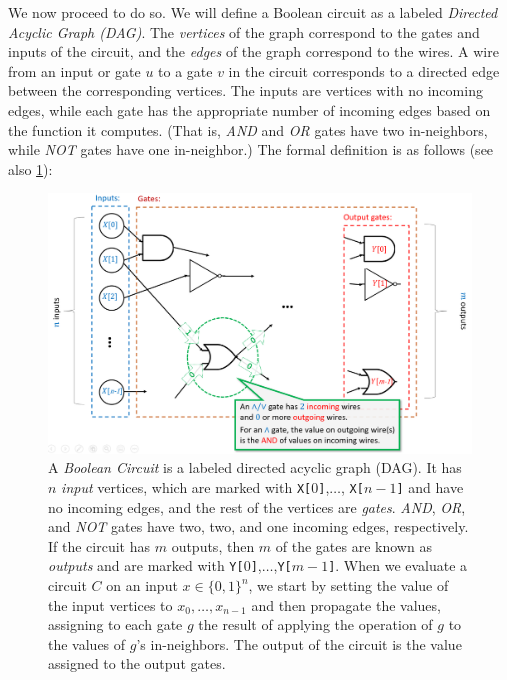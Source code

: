 We now proceed to do so. We will define a Boolean circuit as a labeled
\emph{Directed Acyclic Graph (DAG)}. The \emph{vertices} of the graph
correspond to the gates and inputs of the circuit, and the \emph{edges}
of the graph correspond to the wires. A wire from an input or gate \(u\)
to a gate \(v\) in the circuit corresponds to a directed edge between
the corresponding vertices. The inputs are vertices with no incoming
edges, while each gate has the appropriate number of incoming edges
based on the function it computes. (That is, \emph{AND} and \emph{OR}
gates have two in-neighbors, while \emph{NOT} gates have one
in-neighbor.) The formal definition is as follows (see also
\cref{generalcircuitfig}):


\begin{figure}
\centering
\includegraphics[width=\textwidth, height=0.25\paperheight, keepaspectratio]{../figure/generalcircuit.png}
\caption{A \emph{Boolean Circuit} is a labeled directed acyclic graph
(DAG). It has \(n\) \emph{input} vertices, which are marked with
\texttt{X[}\(0\)\texttt{]},\(\ldots\), \texttt{X[}\(n-1\)\texttt{]} and
have no incoming edges, and the rest of the vertices are \emph{gates}.
\emph{AND}, \emph{OR}, and \emph{NOT} gates have two, two, and one
incoming edges, respectively. If the circuit has \(m\) outputs, then
\(m\) of the gates are known as \emph{outputs} and are marked with
\texttt{Y[}\(0\)\texttt{]},\(\ldots\),\texttt{Y[}\(m-1\)\texttt{]}. When
we evaluate a circuit \(C\) on an input \(x\in \{0,1\}^n\), we start by
setting the value of the input vertices to \(x_0,\ldots,x_{n-1}\) and
then propagate the values, assigning to each gate \(g\) the result of
applying the operation of \(g\) to the values of \(g\)'s in-neighbors.
The output of the circuit is the value assigned to the output gates.}
\label{generalcircuitfig}
\end{figure}

